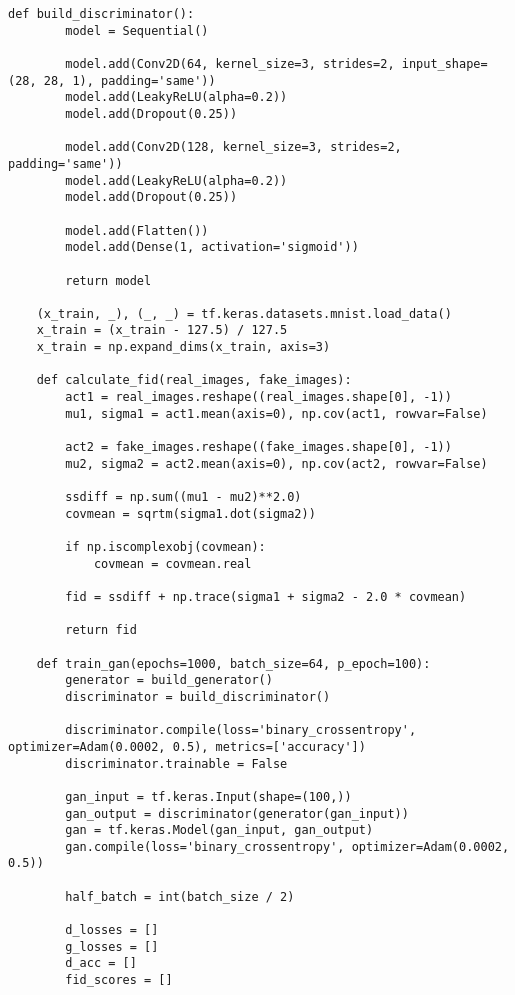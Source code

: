 \begin{lstlisting}[style=mypython, caption= {Explore GAN with 6 Convolutional Layers in Generator \\ and 3 Convolutional Layers in Discriminator}]
    def build_discriminator():
        model = Sequential()
        
        model.add(Conv2D(64, kernel_size=3, strides=2, input_shape=(28, 28, 1), padding='same'))
        model.add(LeakyReLU(alpha=0.2))
        model.add(Dropout(0.25))
    
        model.add(Conv2D(128, kernel_size=3, strides=2, padding='same'))
        model.add(LeakyReLU(alpha=0.2))
        model.add(Dropout(0.25))
    
        model.add(Flatten())
        model.add(Dense(1, activation='sigmoid'))
    
        return model
    
    (x_train, _), (_, _) = tf.keras.datasets.mnist.load_data()
    x_train = (x_train - 127.5) / 127.5
    x_train = np.expand_dims(x_train, axis=3)
    
    def calculate_fid(real_images, fake_images):
        act1 = real_images.reshape((real_images.shape[0], -1))
        mu1, sigma1 = act1.mean(axis=0), np.cov(act1, rowvar=False)
        
        act2 = fake_images.reshape((fake_images.shape[0], -1))
        mu2, sigma2 = act2.mean(axis=0), np.cov(act2, rowvar=False)
        
        ssdiff = np.sum((mu1 - mu2)**2.0)
        covmean = sqrtm(sigma1.dot(sigma2))
        
        if np.iscomplexobj(covmean):
            covmean = covmean.real
        
        fid = ssdiff + np.trace(sigma1 + sigma2 - 2.0 * covmean)
        
        return fid
    
    def train_gan(epochs=1000, batch_size=64, p_epoch=100):
        generator = build_generator()
        discriminator = build_discriminator()
    
        discriminator.compile(loss='binary_crossentropy', optimizer=Adam(0.0002, 0.5), metrics=['accuracy'])
        discriminator.trainable = False
    
        gan_input = tf.keras.Input(shape=(100,))
        gan_output = discriminator(generator(gan_input))
        gan = tf.keras.Model(gan_input, gan_output)
        gan.compile(loss='binary_crossentropy', optimizer=Adam(0.0002, 0.5))
    
        half_batch = int(batch_size / 2)
        
        d_losses = []
        g_losses = []
        d_acc = []
        fid_scores = []
        

\end{lstlisting}
